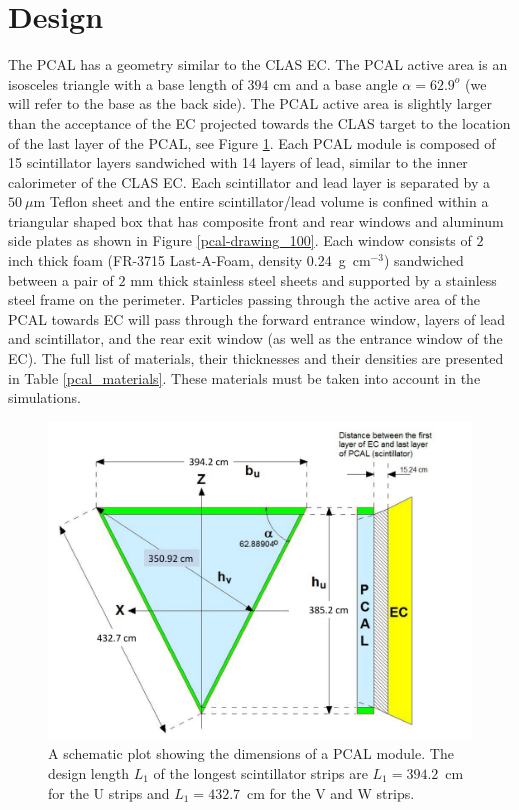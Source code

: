 \section{Design}

The PCAL has a geometry similar to the CLAS EC.  The PCAL active area is an isosceles triangle with a base length of $394$ cm and a base angle $\alpha=62.9^o$ (we will refer to the base as the back side).  The PCAL active area is slightly larger than the acceptance of the EC projected towards the CLAS target to the location of the last layer of the PCAL, see Figure \ref{pcal-triangle}. Each PCAL module is composed of 15 scintillator layers sandwiched with 14 layers of lead, similar to the inner calorimeter of the CLAS EC.  Each scintillator and lead layer is separated by a $50~\mu$m Teflon sheet and the entire scintillator/lead volume is confined within a triangular shaped box that has composite front and rear windows and aluminum side plates as shown in Figure \ref{pcal-drawing_100}. Each window consists of $2$ inch thick foam (FR-3715 Last-A-Foam, density 0.24~g~cm$^{-3}$) sandwiched between a pair of $2$ mm thick stainless steel sheets and supported by a stainless steel frame on the perimeter. Particles passing through the active area of the PCAL towards EC will pass through the forward entrance window, layers of lead and scintillator, and the rear exit window (as well as the entrance window of the EC). The full list of materials, their thicknesses and their densities are presented in Table \ref{pcal_materials}. These materials must be taken into account in the simulations. 
\begin{figure}
\centering
\includegraphics[scale=0.4]{pcal_ec_projection.pdf}
\caption[A schematic plot of PCAL]{A schematic plot showing the dimensions of a PCAL module. The design length $L_1$ of the longest scintillator strips are $L_1=394.2$~cm for the U strips and $L_1=432.7$~cm for the V and W strips. }
\label{pcal-triangle}
\end{figure}
